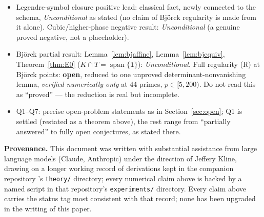\documentclass[11pt]{article}
\theoremstyle{plain}
\theoremstyle{definition}
\theoremstyle{remark}
\begin{document}
\begin{itemize}
conditionally activates Theorem~C, but is itself unconditional as a
dimension/regularity statement).
\item Legendre-symbol closure positive lead: classical fact, newly
connected to the schema, \emph{Unconditional} as stated (no claim of
Bj\"orck regularity is made from it alone). Cubic/higher-phase negative
result: \emph{Unconditional} (a genuine proved negative, not a
placeholder).
\item Bj\"orck partial result: Lemma~\ref{lem:bjaffine},
Lemma~\ref{lem:bjequiv}, Theorem~\ref{thm:E0} ($K\cap T=\operatorname{span}\{\mathbf1\}$):
\emph{Unconditional}. Full regularity (R) at Bj\"orck points:
\textbf{open}, reduced to one unproved determinant-nonvanishing lemma,
\emph{verified numerically only} at 44 primes, $p\in[5,200)$. Do not read
this as ``proved'' --- the reduction is real but incomplete.
\item Q1--Q7: precise open-problem statements as in Section~\ref{sec:open}; Q1 is
settled (restated as a theorem above), the rest range from ``partially
answered'' to fully open conjectures, as stated there.
\end{itemize}

\textbf{Provenance.} This document was written with substantial assistance
from large language models (Claude, Anthropic) under the direction of
Jeffery Kline, drawing on a longer working record of derivations kept in
the companion repository \cite{CazacAlgorithmRepo}'s {\tt theory/}
directory; every numerical claim above is backed by a named script in
that repository's {\tt experiments/} directory. Every claim above carries
the status tag most consistent with that record; none has been upgraded
in the writing of this paper.
\end{document}
